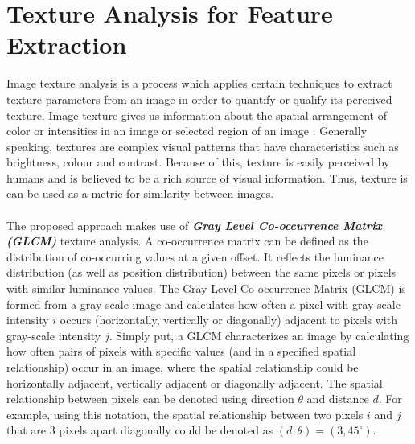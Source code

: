 \section{Texture Analysis for Feature Extraction}
Image texture analysis is a process which applies certain techniques to extract texture parameters from an image in order to quantify or qualify its perceived texture. Image texture gives us information about the spatial arrangement of color or intensities in an image or selected region of an image \cite{REF21}. Generally speaking, textures are complex visual patterns that have characteristics such as brightness, colour and contrast. Because of this, texture is easily perceived by humans and is believed to be a rich source of visual information. Thus, texture is can be used as a metric for similarity between images.\\ \\
%
The proposed approach makes use of \textbf{\textit{Gray Level Co-occurrence Matrix (GLCM)}} texture analysis. A co-occurrence matrix can be defined as the distribution of co-occurring values at a given offset. It reflects the luminance distribution (as well as position distribution) between the same pixels or pixels with similar luminance values. The Gray Level Co-occurrence Matrix (GLCM) is formed from a gray-scale image and calculates how often a pixel with gray-scale intensity $i$ occurs (horizontally, vertically or diagonally) adjacent to pixels with gray-scale intensity $j$. Simply put, a GLCM characterizes an image by calculating how often pairs of pixels with specific values (and in a specified spatial relationship) occur in an image, where the spatial relationship could be horizontally adjacent, vertically adjacent or diagonally adjacent. The spatial relationship between pixels can be denoted using direction $\theta$ and distance $d$. For example, using this notation, the spatial relationship between two pixels $i$ and $j$ that are 3 pixels apart diagonally could be denoted as $(d,\theta) = (3,45^\circ)$.\\ \\

